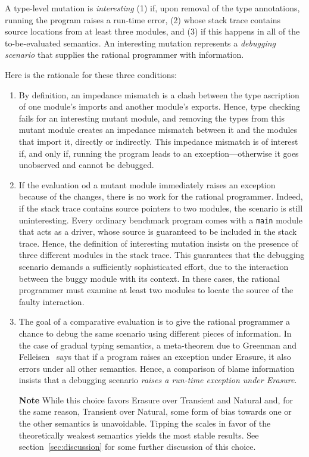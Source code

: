 
A type-level mutation is {\em interesting\/} (1) if, upon removal of the type
annotations, running the program raises a run-time error, (2) whose stack trace
contains source locations from at least three modules, and (3) if this happens
in all of the to-be-evaluated semantics. An interesting mutation represents a
{\em debugging scenario\/} that supplies the rational programmer with
information.

Here is the rationale for these three conditions:
\begin{enumerate}

\item By definition, an impedance mismatch is a clash between the type ascription of
one module's imports and another module's exports. Hence, type checking fails for an
interesting mutant module, and removing the types from this mutant module
creates an impedance mismatch between it and the modules that import it,
directly or indirectly. This impedance mismatch is of interest if, and only if,
running the program leads to an exception---otherwise it goes unobserved and
cannot be debugged.

\item If the evaluation od a mutant module immediately raises an exception because
of the changes, there is no work for the rational programmer. Indeed, if the
stack trace contains source pointers to two modules, the scenario is still
uninteresting. Every ordinary benchmark program comes with a {\tt main} module
that acts as a driver, whose source is guaranteed to be included in the stack
trace.  Hence, the definition of interesting mutation insists on the presence of
three different modules in the stack trace. This guarantees that the debugging
scenario demands a sufficiently sophisticated effort, due to the interaction
between the buggy module with its context.  In these cases, the rational
programmer must examine at least two modules to locate the source of the faulty
interaction.

\item The goal of a comparative evaluation is to give the rational programmer a
chance to debug the same scenario using different pieces of information.  In the
case of gradual typing semantics, a meta-theorem due to Greenman and
Felleisen~\cite{gf-icfp-2018} says that if a program raises an exception under
Erasure, it also errors under all other semantics.  Hence, a comparison of blame
information insists that a debugging scenario {\em raises a run-time exception
under Erasure\/}.

{\bf Note} While this choice favors Erasure over Transient and Natural and, for
the same reason, Transient over Natural, some form of bias towards one or the
other semantics is unavoidable. Tipping the scales in favor of the theoretically
weakest semantics yields the most stable results. See
section~\ref{sec:discussion} for some further discussion of this choice.

\end{enumerate}

